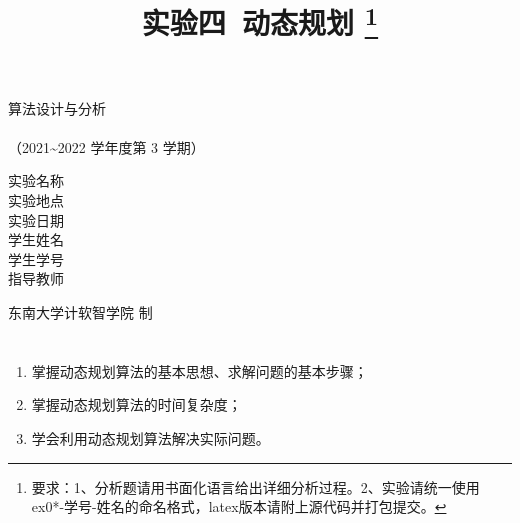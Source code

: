 \documentclass[12pt,a4paper]{ctexart}
\begin{document}
    \begin{titlepage}
        \heiti
        \vspace*{64pt}
        \begin{center}
            \fontsize{48pt}{0} 算法设计与分析\\
            \vspace*{36pt}
            \\
            \vspace*{48pt}
            \LARGE（2021\~{}2022 学年度\qquad 第 3 学期）\\
            \vspace*{48pt}
        
            \LARGE 实验名称\ \ \underline{\makebox[200pt]{\ExamTitle}}\\
            \LARGE 实验地点\ \ \underline{\makebox[200pt]{\ExamAddr}}\\
            \LARGE 实验日期\ \ \underline{\makebox[200pt]{\today}}\\
            \LARGE 学生姓名\ \ \underline{\makebox[200pt]{\MyName}}\\
            \LARGE 学生学号\ \ \underline{\makebox[200pt]{\MySID}}\\
            \LARGE 指导教师\ \ \underline{\makebox[200pt]{\TeacherName}}\\
            \vspace*{48pt}
            
            \LARGE 东南大学\quad  计软智学院 \quad 制
        \end{center}
    \end{titlepage}

\title{
  {\heiti \textbf{实验四\ 动态规划}
    \footnote{要求：1、分析题请用书面化语言给出详细分析过程。2、实验请统一使用ex0*-学号-姓名的命名格式，latex版本请附上源代码并打包提交。}
    }
}
\date{}

\maketitle

\section*{\bf \color{black}{一、实验目的及意义}}
\noindent
\begin{enumerate}
	\item[(1)]  掌握动态规划算法的基本思想、求解问题的基本步骤；
	\item[(2)]  掌握动态规划算法的时间复杂度；
	\item[(3)]  学会利用动态规划算法解决实际问题。
\end{enumerate}
\end{document}
